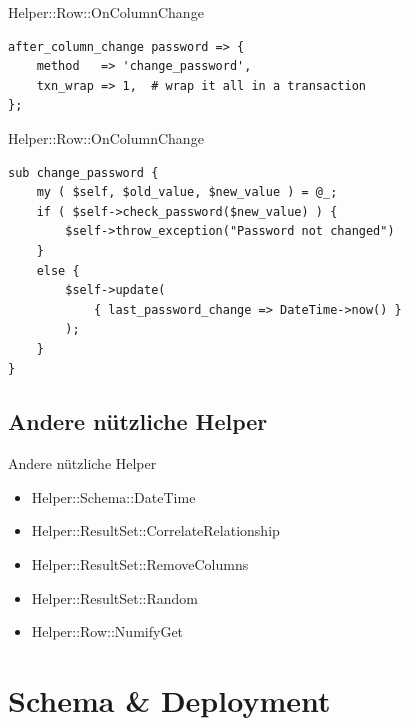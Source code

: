 \begin{frame}[fragile]{Helper::Row::OnColumnChange}
\begin{lstlisting}
after_column_change password => {
    method   => 'change_password',
    txn_wrap => 1,  # wrap it all in a transaction
};
\end{lstlisting}
\end{frame}

\begin{frame}[fragile]{Helper::Row::OnColumnChange}
\begin{lstlisting}
sub change_password {
    my ( $self, $old_value, $new_value ) = @_;
    if ( $self->check_password($new_value) ) {
        $self->throw_exception("Password not changed")
    }
    else {
        $self->update(
            { last_password_change => DateTime->now() }
        );
    }
}
\end{lstlisting}
\end{frame}

\subsection{Andere nützliche Helper}
\begin{frame}{Andere nützliche Helper}
\begin{itemize}
\item Helper::Schema::DateTime
\item Helper::ResultSet::CorrelateRelationship
\item Helper::ResultSet::RemoveColumns
\item Helper::ResultSet::Random
\item Helper::Row::NumifyGet
\end{itemize}
\end{frame}


\section{Schema \& Deployment}

